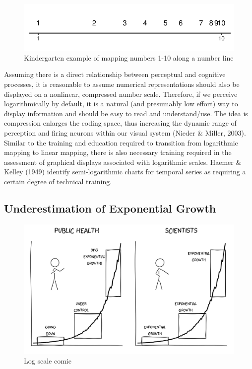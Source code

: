\documentclass[print]{nuthesis}
\begin{document}
\begin{figure}[tbp]

{\centering \includegraphics[width=0.65\linewidth,]{thesis_files/figure-latex/log-number-line-1} 

}

\caption{Kindergarten example of mapping numbers 1-10 along a number line}\label{fig:log-number-line}
\end{figure}

Assuming there is a direct relationship between perceptual and cognitive processes, it is reasonable to assume numerical representations should also be displayed on a nonlinear, compressed number scale. Therefore, if we perceive logarithmically by default, it is a natural (and presumably low effort) way to display information and should be easy to read and understand/use.
The idea is compression enlarges the coding space, thus increasing the dynamic range of perception and firing neurons within our visual system (Nieder \& Miller, 2003).
Similar to the training and education required to transition from logarithmic mapping to linear mapping, there is also necessary training required in the assessment of graphical displays associated with logarithmic scales. Haemer \& Kelley (1949) identify semi-logarithmic charts for temporal series as requiring a certain degree of technical training.

\hypertarget{underestimation}{%
\subsection{Underestimation of Exponential Growth}\label{underestimation}}

\begin{figure}[tbp]

{\centering \includegraphics[width=1\linewidth,]{images/exponential-stages-comic} 

}

\caption{Log scale comic}\label{fig:exponential-stages-comic}
\end{figure}
\end{document}
